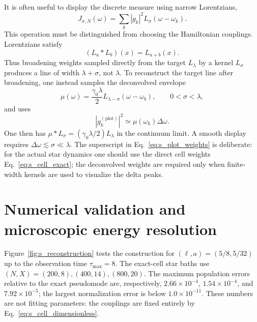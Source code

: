\documentclass[reprint,superscriptaddress,floatfix,amsmath,amssymb,prresearch,aps]{revtex4-2}
\begin{document}
It is often useful to display the discrete measure using narrow Lorentzians,
\begin{equation}
J_{\sigma,N}(\omega)=\sum_k|g_k|^2
L_\sigma(\omega-\omega_k).
\label{eq:s_broadened}
\end{equation}
This operation must be distinguished from choosing the Hamiltonian
couplings. Lorentzians satisfy
\begin{equation}
(L_a*L_b)(x)=L_{a+b}(x).
\label{eq:s_convolution}
\end{equation}
Thus broadening weights sampled directly from the target \(L_\lambda\) by a
kernel \(L_\sigma\) produces a line of width \(\lambda+\sigma\), not
\(\lambda\). To reconstruct the target line after broadening, one instead
samples the deconvolved envelope
\begin{equation}
\mu(\omega)=\frac{\gamma_0\lambda}{2}
L_{\lambda-\sigma}(\omega-\omega_b),
\qquad 0<\sigma<\lambda,
\label{eq:s_deconvolved}
\end{equation}
and uses
\begin{equation}
|g_k^{(\mathrm{plot})}|^2\simeq\mu(\omega_k)\Delta\omega.
\label{eq:s_plot_weights}
\end{equation}
One then has
\(\mu*L_\sigma=(\gamma_0\lambda/2)L_\lambda\) in the continuum limit.
A smooth display requires \(\Delta\omega\lesssim\sigma\ll\lambda\).
The superscript in Eq.~\eqref{eq:s_plot_weights} is deliberate: for the
actual star dynamics one should use the direct cell weights
Eq.~\eqref{eq:s_cell_exact}; the deconvolved weights are required only when
finite-width kernels are used to visualize the delta peaks.

\section{Numerical validation and microscopic energy resolution}
\label{sec:s_validation}

Figure~\ref{fig:s_reconstruction} tests the construction for
\((\ell,a)=(5/8,5/32)\) up to the observation time
\(\tau_{\max}=8\). The exact-cell star baths use
\((N,X)=(200,8),(400,14),(800,20)\). The maximum population errors relative
to the exact pseudomode are, respectively,
\(2.66\times10^{-4}\), \(1.54\times10^{-4}\), and
\(7.92\times10^{-5}\); the largest normalization error is below
\(1.0\times10^{-11}\). These numbers are not fitting parameters: the
couplings are fixed entirely by Eq.~\eqref{eq:s_cell_dimensionless}.
\end{document}
